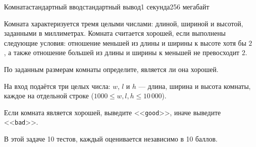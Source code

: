 \begin{problem}{Комната}{стандартный ввод}{стандартный вывод}{1 секунда}{256 мегабайт}

Комната характеризуется тремя целыми числами: длиной, шириной и высотой, заданными в миллиметрах. Комната считается хорошей, если выполнены следующие условия: отношение меньшей из длины и ширины к высоте хотя бы $2$, а также отношение большей из длины и ширины к меньшей не превосходит $2$.

По заданным размерам комнаты определите, является ли она хорошей.

\InputFile
На вход подаётся три целых числа: $w$, $l$ и $h$ --- длина, ширина и высота комнаты, каждое на отдельной строке ($1000 \le w, l, h \le 10\,000$).

\OutputFile
Если комната является хорошей, выведите <<\texttt{good}>>, иначе выведите <<\texttt{bad}>>.

\Scoring
В этой задаче 10 тестов, каждый оценивается независимо в 10 баллов.

\Examples

\begin{example}
%
%
\end{example}

\end{problem}

